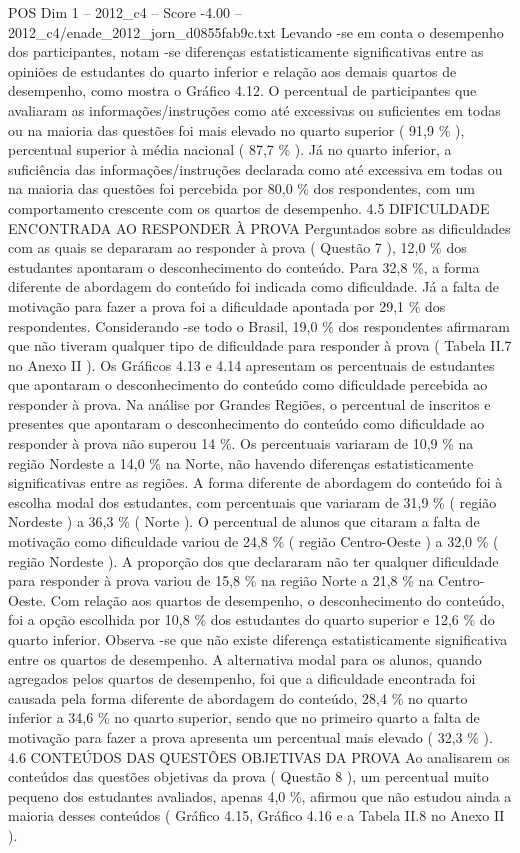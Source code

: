 \begin{textsample}{POS Dim 1 – 2012\_c4 – Score -4.00 – 2012\_c4/enade\_2012\_jorn\_d0855fab9c.txt}
Levando -se em conta o desempenho dos participantes, notam -se diferenças estatisticamente significativas entre as opiniões de estudantes do quarto inferior e relação aos demais quartos de desempenho, como mostra o Gráfico 4.12.
O percentual de participantes que avaliaram as informações/instruções como até excessivas ou suficientes em todas ou na maioria das questões foi mais elevado no quarto superior ( 91,9 \% ), percentual superior à média nacional ( 87,7 \% ).
Já no quarto inferior, a suficiência das informações/instruções declarada como até excessiva em todas ou na maioria das questões foi percebida por 80,0 \% dos respondentes, com um comportamento crescente com os quartos de desempenho. 4.5 DIFICULDADE ENCONTRADA AO RESPONDER À PROVA Perguntados sobre as dificuldades com as quais se depararam ao responder à prova ( Questão 7 ), 12,0 \% dos estudantes apontaram o desconhecimento do conteúdo.
Para 32,8 \%, a forma diferente de abordagem do conteúdo foi indicada como dificuldade.
Já a falta de motivação para fazer a prova foi a dificuldade apontada por 29,1 \% dos respondentes.
Considerando -se todo o Brasil, 19,0 \% dos respondentes afirmaram que não tiveram qualquer tipo de dificuldade para responder à prova ( Tabela II.7 no Anexo II ).
Os Gráficos 4.13 e 4.14 apresentam os percentuais de estudantes que apontaram o desconhecimento do conteúdo como dificuldade percebida ao responder à prova.
Na análise por Grandes Regiões, o percentual de inscritos e presentes que apontaram o desconhecimento do conteúdo como dificuldade ao responder à prova não superou 14 \%.
Os percentuais variaram de 10,9 \% na região Nordeste a 14,0 \% na Norte, não havendo diferenças estatisticamente significativas entre as regiões.
A forma diferente de abordagem do conteúdo foi à escolha modal dos estudantes, com percentuais que variaram de 31,9 \% ( região Nordeste ) a 36,3 \% ( Norte ).
O percentual de alunos que citaram a falta de motivação como dificuldade variou de 24,8 \% ( região Centro-Oeste ) a 32,0 \% ( região Nordeste ).
A proporção dos que declararam não ter qualquer dificuldade para responder à prova variou de 15,8 \% na região Norte a 21,8 \% na Centro-Oeste.
Com relação aos quartos de desempenho, o desconhecimento do conteúdo, foi a opção escolhida por 10,8 \% dos estudantes do quarto superior e 12,6 \% do quarto inferior.
Observa -se que não existe diferença estatisticamente significativa entre os quartos de desempenho.
A alternativa modal para os alunos, quando agregados pelos quartos de desempenho, foi que a dificuldade encontrada foi causada pela forma diferente de abordagem do conteúdo, 28,4 \% no quarto inferior a 34,6 \% no quarto superior, sendo que no primeiro quarto a falta de motivação para fazer a prova apresenta um percentual mais elevado ( 32,3 \% ). 4.6 CONTEÚDOS DAS QUESTÕES OBJETIVAS DA PROVA Ao analisarem os conteúdos das questões objetivas da prova ( Questão 8 ), um percentual muito pequeno dos estudantes avaliados, apenas 4,0 \%, afirmou que não estudou ainda a maioria desses conteúdos ( Gráfico 4.15, Gráfico 4.16 e a Tabela II.8 no Anexo II ).

\end{textsample}

